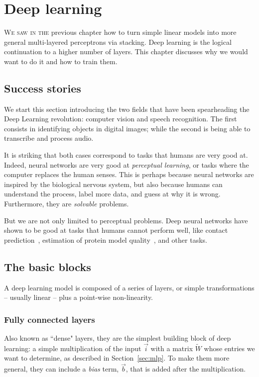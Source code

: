 \chapter{Deep learning}
\lettrine[lines=3, lhang=0.1, nindent=0em, findent=3pt]{\color{Maroon}W}{e saw in the}
previous chapter how to turn simple linear models into more general multi-layered perceptrons via stacking.
Deep learning is the logical continuation to a higher number of layers.
This chapter discusses why we would want to do it and how to train them.

\section*{Success stories}
We start this section introducing the two fields that have been spearheading the Deep Learning revolution: computer vision and speech recognition.
The first consists in identifying objects in digital images; while the second is being able to transcribe and process audio.

It is striking that both cases correspond to tasks that humans are very good at.
Indeed, neural networks are very good at \emph{perceptual learning}, or tasks where the computer replaces the human senses.
This is perhaps because neural networks are inspired by the biological nervous system, but also because humans can understand the process,
label more data, and guess at why it is wrong.
Furthermore, they are \emph{solvable} problems.

But we are not only limited to perceptual problems.
Deep neural networks have shown to be good at tasks that humans cannot perform well, like contact prediction~\citep{ultra_deep_contacts}, estimation of protein model quality~\citep{casp13_ema}, and other tasks.


\section{The basic blocks}
A deep learning model is composed of a series of layers, or simple transformations -- usually linear -- plus a point-wise non-linearity.


\subsection{Fully connected layers}
Also known as ``dense" layers, they are the simplest building block of deep learning: a simple multiplication of the input $\vec{i}$ with a matrix $\widetilde{W}$ whose entries we want to determine, as described in Section~\ref{sec:mlp}.
To make them more general, they can include a \emph{bias} term, $\vec b$, that is added after the multiplication.

